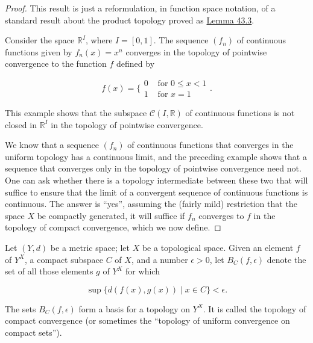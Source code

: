 \begin{proof}
This result is just a reformulation, in function space notation, of a standard result about the product topology proved as \hyperref[lem:43.3]{Lemma 43.3}.
\begin{centeredblock}
\begin{example}
\label{ex:\thesection.\theexample}
Consider the space \(\mathbb{R}^{I}\), where \(I = [ {0,1}]\). The sequence \((f_{n})\) of continuous functions given by \(f_{n}(x) = x^{n}\) converges in the topology of pointwise convergence to the function \(f\) defined by

\[
f(x) = \{ \begin{array}{ll} 0 & \text{ for }0 \leq x < 1 \\ 1 & \text{ for }x = 1 \end{array}.
\]
\end{example}
\end{centeredblock}

This example shows that the subspace \(\mathcal{C}({I,\mathbb{R}})\) of continuous functions is not closed in \(\mathbb{R}^{I}\) in the topology of pointwise convergence.

We know that a sequence \((f_{n})\) of continuous functions that converges in the uniform topology has a continuous limit, and the preceding example shows that a sequence that converges only in the topology of pointwise convergence need not. One can ask whether there is a topology intermediate between these two that will suffice to ensure that the limit of a convergent sequence of continuous functions is continuous. The answer is ``yes'', assuming the (fairly mild) restriction that the space \(X\) be compactly generated, it will suffice if \(f_{n}\) converges to \(f\) in the topology of compact convergence, which we now define.
\end{proof}
\begin{definition}
Let \((Y, d)\) be a metric space; let \(X\) be a topological space. Given an element \(f\) of \(Y^{X}\), a compact subspace \(C\) of \(X\), and a number \(\epsilon > 0\), let \(B_{C}({f,\epsilon })\) denote the set of all those elements \(g\) of \(Y^{X}\) for which

\[
\sup \{ d({f(x),g(x) }) \mid x \in C\} < \epsilon .
\]

The sets \(B_{C}({f,\epsilon })\) form a basis for a topology on \(Y^{X}\). It is called the topology of compact convergence (or sometimes the ``topology of uniform convergence on compact sets'').
\end{definition}

